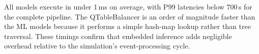 All models execute in under 1\,ms on average, with P99 latencies below 700\,\textmu s for the complete pipeline. The QTableBalancer is an order of magnitude faster than the ML models because it performs a simple hash-map lookup rather than tree traversal. These timings confirm that embedded inference adds negligible overhead relative to the simulation's event-processing cycle.

